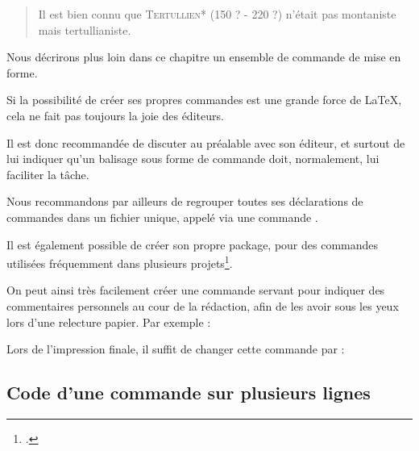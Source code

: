 \begin{latexcode}
\newcommand{\auteur}[2]{\textsc{#1}* (#2)}
\end{latexcode}

\renewcommand{\auteur}[2]{\textsc{#1}* (#2)}

\begin{quotation}
Il est bien connu que \auteur{Tertullien}{150 ? - 220 ?}
n'était pas montaniste mais tertullianiste.
\end{quotation}

Nous décrirons plus loin dans ce chapitre un ensemble de commande de mise en forme.

\begin{attention}
	Si la possibilité de créer ses propres commandes est une grande force de \LaTeX, cela ne fait pas toujours la joie des éditeurs. 
	
	Il est donc recommandée de discuter au préalable avec son éditeur, et surtout de lui indiquer qu'un balisage sous forme de commande doit, normalement, lui faciliter la tâche.
	
	
	Nous recommandons par ailleurs de regrouper toutes ses déclarations de commandes dans un fichier unique, appelé via une commande .
	
	Il est également possible de créer son propre package, pour des commandes utilisées fréquemment dans plusieurs projets\footcite[Ceci dépasserais le cadre de cet ouvrage : je renvois à d'autres documents. Par exemples][]{creer_sty}.
\end{attention}


\begin{plusloins}\label{commentaireredac}
On peut ainsi très facilement créer une commande  servant pour indiquer des commentaires personnels au cour de la rédaction, afin de les avoir sous les yeux lors d'une relecture papier.
Par exemple :

\begin{latexcode}
\newcommand{\commentaire}[1]{\marginpar{#1}}
\end{latexcode}

Lors de l'impression finale, il suffit de changer cette commande par :

\begin{latexcode}
\newcommand{\commentaire}[1]{}
\end{latexcode}

\end{plusloins}

\subsection{Code d'une commande sur plusieurs lignes}\label{commandepourcent}

